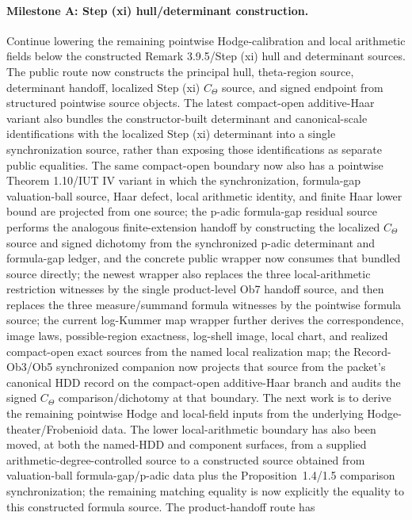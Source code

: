 \documentclass[11pt]{article}
\theoremstyle{plain}
\theoremstyle{definition}
\theoremstyle{remark}
\begin{document}
\paragraph{Milestone A: Step (xi) hull/determinant construction.}
Continue lowering the remaining pointwise Hodge-calibration and local
arithmetic fields below the constructed Remark 3.9.5/Step (xi) hull and
determinant sources.  The public route now constructs the principal hull,
theta-region source, determinant handoff, localized Step (xi) \(C_\Theta\)
source, and signed endpoint from structured pointwise source objects.  The
latest compact-open additive-Haar variant also bundles the constructor-built
determinant and canonical-scale identifications with the localized Step (xi)
determinant into a single synchronization source, rather than exposing those
identifications as separate public equalities.  The same compact-open boundary
now also has a pointwise Theorem 1.10/IUT IV variant in which the
synchronization, formula-gap valuation-ball source, Haar defect, local
arithmetic identity, and finite Haar lower bound are projected from one source;
the p-adic formula-gap residual source performs the analogous finite-extension
handoff by constructing the localized \(C_\Theta\) source and signed dichotomy
from the synchronized p-adic determinant and formula-gap ledger, and the
concrete public wrapper now consumes that bundled source directly; the newest
wrapper also replaces the three local-arithmetic restriction witnesses by the
single product-level Ob7 handoff source, and then replaces the three
measure/summand formula witnesses by the pointwise formula source; the current
log-Kummer map wrapper further derives the correspondence, image laws,
possible-region exactness, log-shell image, local chart, and realized
compact-open exact sources from the named local realization map;
the Record-Ob3/Ob5 synchronized
companion now projects that source from the packet's canonical HDD record on
the compact-open additive-Haar branch and audits the signed \(C_\Theta\)
comparison/dichotomy at that boundary.  The next work is to derive the
remaining pointwise Hodge and local-field inputs from the underlying
Hodge-theater/Frobenioid data.  The lower local-arithmetic boundary has also
been moved, at both the named-HDD and component surfaces, from a supplied
arithmetic-degree-controlled source to a constructed source obtained from
valuation-ball formula-gap/p-adic data plus the Proposition~1.4/1.5 comparison
synchronization; the remaining matching equality is now explicitly the
equality to this constructed formula source.  The product-handoff route has
\end{document}
